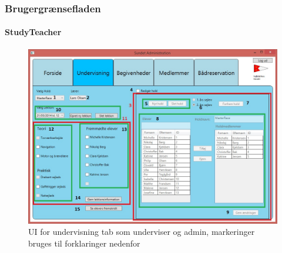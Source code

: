 \subsubsection{Brugergrænsefladen}
\paragraph*{StudyTeacher}
\begin{figure}[htbp]
  \centering
  \includegraphics[width=1\textwidth]{images/UI/StudyTeacherMarked.jpg}
  \caption[UIStudyTeacher]{UI for undervisning tab som underviser og admin, markeringer bruges til forklaringer nedenfor}
  \label{fig:StudyTeacher}
\end{figure}

